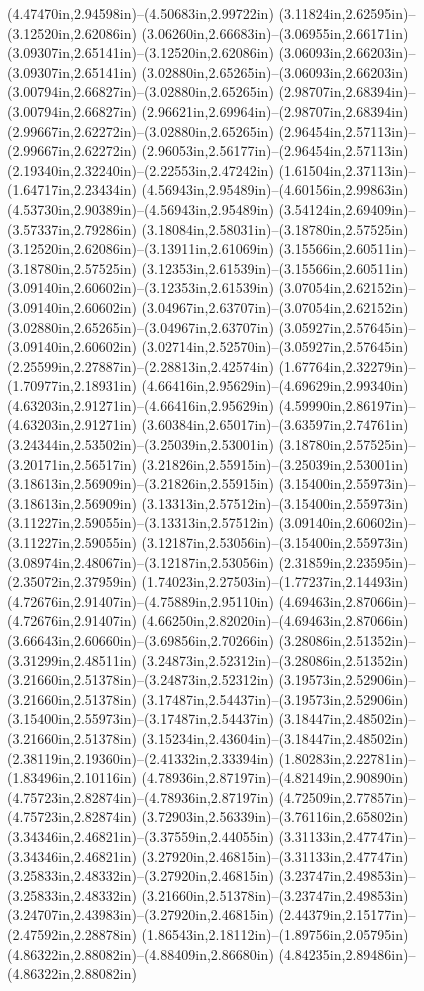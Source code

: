 (4.47470in,2.94598in)--(4.50683in,2.99722in) (3.11824in,2.62595in)--(3.12520in,2.62086in) (3.06260in,2.66683in)--(3.06955in,2.66171in) (3.09307in,2.65141in)--(3.12520in,2.62086in) (3.06093in,2.66203in)--(3.09307in,2.65141in) (3.02880in,2.65265in)--(3.06093in,2.66203in) (3.00794in,2.66827in)--(3.02880in,2.65265in) (2.98707in,2.68394in)--(3.00794in,2.66827in) (2.96621in,2.69964in)--(2.98707in,2.68394in) (2.99667in,2.62272in)--(3.02880in,2.65265in) (2.96454in,2.57113in)--(2.99667in,2.62272in) (2.96053in,2.56177in)--(2.96454in,2.57113in) (2.19340in,2.32240in)--(2.22553in,2.47242in) (1.61504in,2.37113in)--(1.64717in,2.23434in) (4.56943in,2.95489in)--(4.60156in,2.99863in) (4.53730in,2.90389in)--(4.56943in,2.95489in) (3.54124in,2.69409in)--(3.57337in,2.79286in) (3.18084in,2.58031in)--(3.18780in,2.57525in) (3.12520in,2.62086in)--(3.13911in,2.61069in) (3.15566in,2.60511in)--(3.18780in,2.57525in) (3.12353in,2.61539in)--(3.15566in,2.60511in) (3.09140in,2.60602in)--(3.12353in,2.61539in) (3.07054in,2.62152in)--(3.09140in,2.60602in) (3.04967in,2.63707in)--(3.07054in,2.62152in) (3.02880in,2.65265in)--(3.04967in,2.63707in) (3.05927in,2.57645in)--(3.09140in,2.60602in) (3.02714in,2.52570in)--(3.05927in,2.57645in) (2.25599in,2.27887in)--(2.28813in,2.42574in) (1.67764in,2.32279in)--(1.70977in,2.18931in) (4.66416in,2.95629in)--(4.69629in,2.99340in) (4.63203in,2.91271in)--(4.66416in,2.95629in) (4.59990in,2.86197in)--(4.63203in,2.91271in) (3.60384in,2.65017in)--(3.63597in,2.74761in) (3.24344in,2.53502in)--(3.25039in,2.53001in) (3.18780in,2.57525in)--(3.20171in,2.56517in) (3.21826in,2.55915in)--(3.25039in,2.53001in) (3.18613in,2.56909in)--(3.21826in,2.55915in) (3.15400in,2.55973in)--(3.18613in,2.56909in) (3.13313in,2.57512in)--(3.15400in,2.55973in) (3.11227in,2.59055in)--(3.13313in,2.57512in) (3.09140in,2.60602in)--(3.11227in,2.59055in) (3.12187in,2.53056in)--(3.15400in,2.55973in) (3.08974in,2.48067in)--(3.12187in,2.53056in) (2.31859in,2.23595in)--(2.35072in,2.37959in) (1.74023in,2.27503in)--(1.77237in,2.14493in) (4.72676in,2.91407in)--(4.75889in,2.95110in) (4.69463in,2.87066in)--(4.72676in,2.91407in) (4.66250in,2.82020in)--(4.69463in,2.87066in) (3.66643in,2.60660in)--(3.69856in,2.70266in) (3.28086in,2.51352in)--(3.31299in,2.48511in) (3.24873in,2.52312in)--(3.28086in,2.51352in) (3.21660in,2.51378in)--(3.24873in,2.52312in) (3.19573in,2.52906in)--(3.21660in,2.51378in) (3.17487in,2.54437in)--(3.19573in,2.52906in) (3.15400in,2.55973in)--(3.17487in,2.54437in) (3.18447in,2.48502in)--(3.21660in,2.51378in) (3.15234in,2.43604in)--(3.18447in,2.48502in) (2.38119in,2.19360in)--(2.41332in,2.33394in) (1.80283in,2.22781in)--(1.83496in,2.10116in) (4.78936in,2.87197in)--(4.82149in,2.90890in) (4.75723in,2.82874in)--(4.78936in,2.87197in) (4.72509in,2.77857in)--(4.75723in,2.82874in) (3.72903in,2.56339in)--(3.76116in,2.65802in) (3.34346in,2.46821in)--(3.37559in,2.44055in) (3.31133in,2.47747in)--(3.34346in,2.46821in) (3.27920in,2.46815in)--(3.31133in,2.47747in) (3.25833in,2.48332in)--(3.27920in,2.46815in) (3.23747in,2.49853in)--(3.25833in,2.48332in) (3.21660in,2.51378in)--(3.23747in,2.49853in) (3.24707in,2.43983in)--(3.27920in,2.46815in) (2.44379in,2.15177in)--(2.47592in,2.28878in) (1.86543in,2.18112in)--(1.89756in,2.05795in) (4.86322in,2.88082in)--(4.88409in,2.86680in) (4.84235in,2.89486in)--(4.86322in,2.88082in) 
